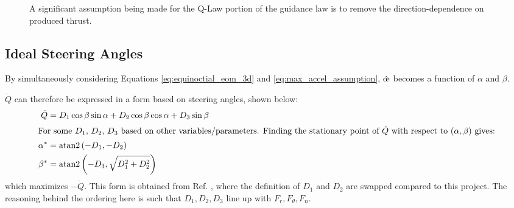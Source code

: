\begin{figure}
    \centering
    \caption{A significant assumption being made for the Q-Law portion of the guidance law is to remove the direction-dependence on produced thrust.}
    \label{fig:thrust_curve}
\end{figure}

\subsection{Ideal Steering Angles}
By simultaneously considering Equations \ref{eq:equinoctial_eom_3d} and \ref{eq:max_accel_assumption}, $\dot{\moe}$ becomes a function of $\alpha$ and $\beta$.

$\dot{Q}$ can therefore be expressed in a form based on steering angles, shown below:
\begin{align}
    \dot{Q} &= D_1 \cos \beta \sin \alpha + D_2 \cos \beta \cos \alpha + D_3 \sin \beta \label{eq:q_dot_angles_form}\\
    \intertext{For some $D_1$, $D_2$, $D_3$ based on other variables/parameters. Finding the stationary point of $\dot{Q}$ with respect to $(\alpha, \beta)$ gives:}
    \alpha^* &= \mathrm{atan2}\left(-D_1, -D_2\right) \label{eq:alpha_star}\\
    \beta^* &= \mathrm{atan2}\left(-D_3, \sqrt{D_1^2 + D_2^2}\right) \label{eq:beta_star}
\end{align}
which maximizes $-\dot{Q}$. This form is obtained from Ref. \cite{vargaperez2016}, where the definition of $D_1$ and $D_2$ are swapped compared to this project. The reasoning behind the ordering here is such that $D_1, D_2, D_3$ line up with $F_r, F_\theta, F_n$. 

